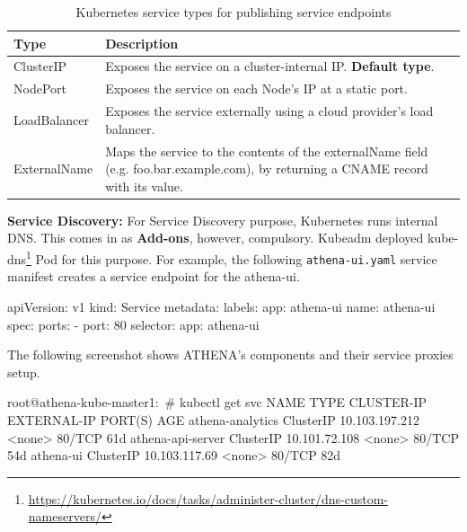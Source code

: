 \begin{table}[H]
\centering
    \begin{tabular}{ | l | p{11cm} |}
    \hline
    Type & Description \\ \hline
    ClusterIP & Exposes the service on a cluster-internal IP. \textbf{Default type}. \\ \hline
    NodePort & Exposes the service on each Node’s IP at a static port. \\  \hline
    LoadBalancer & Exposes the service externally using a cloud provider’s load balancer. \\ \hline
    ExternalName & Maps the service to the contents of the externalName field (e.g. foo.bar.example.com), by returning a CNAME record with its value. \\
    \hline
    \end{tabular}
\caption{Kubernetes service types for publishing service endpoints}
\label{kubeServiceTypes}  
\end{table}

\noindent \textbf{Service Discovery:} \quad For Service Discovery purpose, Kubernetes runs internal DNS. This comes in as \textbf{Add-ons}, however, compulsory. Kubeadm deployed kube-dns\footnote{\url{https://kubernetes.io/docs/tasks/administer-cluster/dns-custom-nameservers/}} Pod for this purpose. For example, the following \verb|athena-ui.yaml| service manifest creates a service endpoint for the athena-ui.

\begin{small}
\begin{lcverbatim}
apiVersion: v1
kind: Service
metadata:
  labels:
    app: athena-ui
  name: athena-ui
spec:
  ports:
    - port: 80
  selector:
    app: athena-ui
\end{lcverbatim}
\end{small}

\noindent The following screenshot shows ATHENA's components and their service proxies setup. 

\begin{small}
\begin{lcverbatim}
root@athena-kube-master1:~# kubectl get svc
NAME                TYPE        CLUSTER-IP       EXTERNAL-IP   PORT(S)   AGE
athena-analytics    ClusterIP   10.103.197.212   <none>        80/TCP    61d
athena-api-server   ClusterIP   10.101.72.108    <none>        80/TCP    54d
athena-ui           ClusterIP   10.103.117.69    <none>        80/TCP    82d
\end{lcverbatim}
\end{small}

